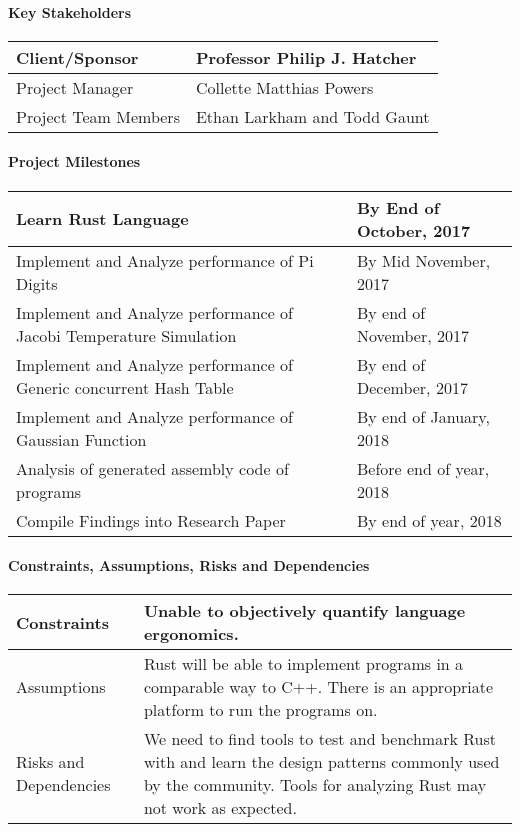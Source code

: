 \documentclass[10pt,a4paper]{report}
\begin{document}
\paragraph{Key Stakeholders}
\begin{flushleft}
	\begin{tabulary}{\textwidth}{ | L | L | }
		\hline
		Client/Sponsor & Professor Philip J. Hatcher \\
		\hline
		Project Manager & Collette Matthias Powers \\
		\hline
		Project Team Members & Ethan Larkham and Todd Gaunt \\
		\hline
	\end{tabulary}
\end{flushleft}
\paragraph{Project Milestones}
\begin{flushleft}
	\begin{tabulary}{\textwidth}{ | L | L | }
		\hline
		Learn Rust Language & By End of October, 2017 \\
		\hline
		Implement and Analyze performance of Pi Digits & By Mid November, 2017 \\
		\hline
		Implement and Analyze performance of Jacobi Temperature
		Simulation & By end of November, 2017 \\
		\hline
		Implement and Analyze performance of Generic concurrent Hash Table
		& By end of December, 2017 \\
		\hline
		Implement and Analyze performance of Gaussian Function &
		By end of January, 2018 \\
		\hline
		Analysis of generated assembly code of programs &
		Before end of year, 2018 \\
		\hline
		Compile Findings into Research Paper & By end of year, 2018 \\
		\hline
	\end{tabulary}
\end{flushleft}
\paragraph{Constraints, Assumptions, Risks and Dependencies}
\begin{flushleft}
	\begin{tabulary}{\textwidth}{ | L | L | }
		\hline
		Constraints & Unable to objectively quantify language
		ergonomics. \\
		\hline
		Assumptions & Rust will be able to implement programs in a
		comparable way to C++. There is an appropriate platform to run
		the programs on. \\
		\hline
		Risks and Dependencies & We need to find tools to test and
    benchmark Rust with and learn the design patterns commonly
    used by the community. Tools for analyzing Rust may not work as expected. \\
		\hline
	\end{tabulary}
\end{flushleft}
\end{document}
